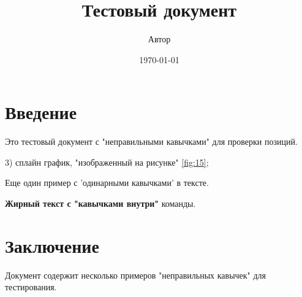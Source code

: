 \documentclass{article}
\begin{document}
\title{Тестовый документ}
\author{Автор}
\date{\today}
\maketitle

\section{Введение}

Это тестовый документ с "неправильными кавычками" для проверки позиций.

\item [3)] сплайн график, "изображенный на рисунке" \ref{fig:15};

Еще один пример с 'одинарными кавычками' в тексте.

\textbf{Жирный текст с "кавычками внутри"} команды.

\section{Заключение}

Документ содержит несколько примеров "неправильных кавычек" для тестирования.
\end{document}
